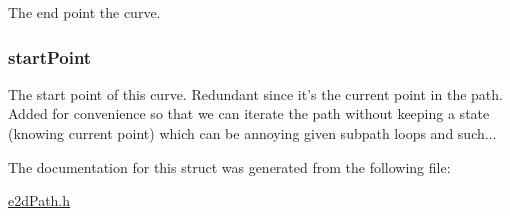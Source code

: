 The end point the curve. \hypertarget{structe2dPathCurve_a96868a222a14861eb6e64214328c6159}{
\subsubsection[{start\-Point}]{ {\bf start\-Point}}}\label{structe2dPathCurve_a96868a222a14861eb6e64214328c6159}
The start point of this curve. Redundant since it's the current point in the path. Added for convenience so that we can iterate the path without keeping a state (knowing current point) which can be annoying given subpath loops and such... 

The documentation for this struct was generated from the following file\-:\begin{DoxyCompactItemize}
\item 
\hyperlink{e2dPath_8h}{e2d\-Path.\-h}\end{DoxyCompactItemize}
